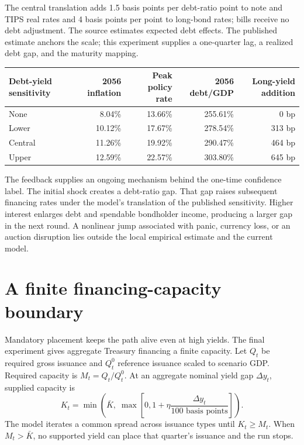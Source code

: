 \documentclass[11pt]{article}
\begin{document}
The central translation adds 1.5 basis points per debt-ratio point to note and TIPS real
rates and 4 basis points per point to long-bond rates; bills receive no debt adjustment.  The
source estimates expected debt effects.  The published estimate anchors the scale; this
experiment supplies a one-quarter lag, a realized debt gap, and the maturity mapping.

\begin{center}
\begin{tabular}{lrrrr}
\toprule
Debt-yield sensitivity & 2056 inflation & Peak policy rate & 2056 debt/GDP & Long-yield addition \\
\midrule
None    & 8.04\%  & 13.66\% & 255.61\% & 0 bp \\
Lower   & 10.12\% & 17.67\% & 278.54\% & 313 bp \\
Central & 11.26\% & 19.92\% & 290.47\% & 464 bp \\
Upper   & 12.59\% & 22.57\% & 303.80\% & 645 bp \\
\bottomrule
\end{tabular}
\end{center}

The feedback supplies an ongoing mechanism behind the one-time confidence label.  The
initial shock creates a debt-ratio gap.  That gap raises subsequent financing rates under the model's
translation of the published sensitivity.  Higher interest enlarges debt and spendable bondholder income, producing a
larger gap in the next round.  A nonlinear jump associated with panic, currency loss, or an
auction disruption lies outside the local empirical estimate and the current model.

\section{A finite financing-capacity boundary}

Mandatory placement keeps the path alive even at high yields.  The final experiment gives
aggregate Treasury financing a finite capacity.  Let $Q_t$ be
required gross issuance and $Q^0_t$ reference issuance scaled to scenario GDP.  Required
capacity is $M_t=Q_t/Q^0_t$.  At an aggregate nominal yield gap $\Delta y_t$, supplied
capacity is
\[
K_t=\min\!\left(\bar K,\;\max\!\left[0,1+\eta
\frac{\Delta y_t}{100\text{ basis points}}\right]\right).
\]
The model iterates a common spread across issuance types until $K_t\ge M_t$.  When
$M_t>\bar K$, no supported yield can place that quarter's issuance and the run stops.
\end{document}
